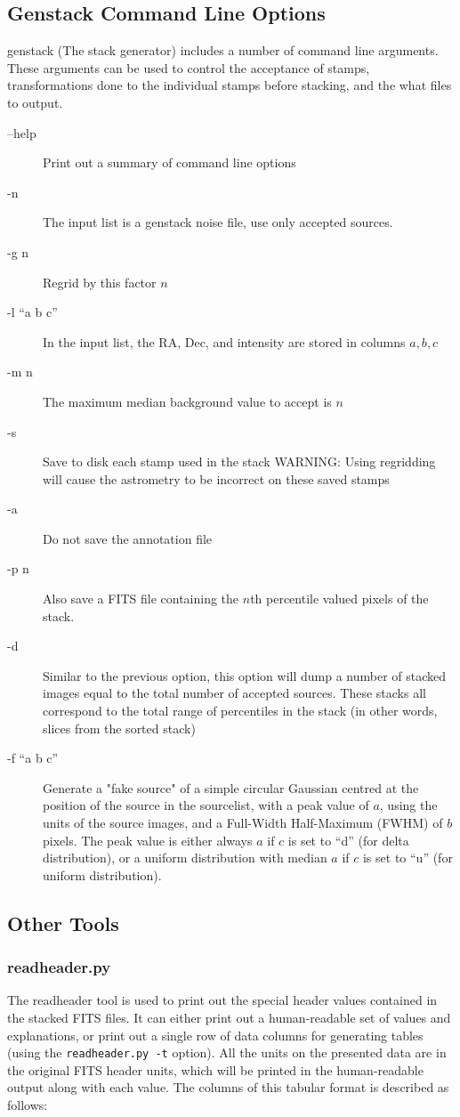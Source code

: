 \documentclass{article}
\begin{document}
\subsection{Genstack Command Line Options}
genstack (The stack generator) includes a number of command line arguments.  
These arguments can be used to control the acceptance of stamps, transformations
done to the individual stamps before stacking, and the what files to output.
\begin{description}
	\item[--help]  Print out a summary of command line options
	\item[-n] The input list is a genstack noise file, use only accepted sources.
	\item[-g n] Regrid by this factor $n$
	\item[-l ``a b c'']  In the input list, the RA, Dec, and intensity are stored in columns $a,b,c$
	\item[-m n] The maximum median background value to accept is $n$
	\item[-s] Save to disk each stamp used in the stack WARNING: Using 
	regridding will cause the astrometry to be incorrect on these saved stamps
	\item[-a] Do not save the annotation file
	\item[-p n] Also save a FITS file containing the $n$th percentile valued 
	pixels of the stack.
	\item[-d] Similar to the previous option, this option will dump a number of
	stacked images equal to the total number of accepted sources.  These stacks
	all correspond to the total range of percentiles in the stack (in other 
	words, slices from the sorted stack)
	\item[-f ``a b c''] Generate a "fake source" of a simple circular Gaussian 
	centred at the position of the source in the sourcelist, with a peak value 
	of $a$, using the units of the source images, and a Full-Width Half-Maximum		(FWHM) of $b$ pixels.  The peak value is either always $a$ if $c$ is set to
	``d'' (for delta distribution), or a uniform distribution with median $a$ if
	$c$ is set to ``u'' (for uniform distribution).
\end{description}

\subsection{Other Tools}
\subsubsection{readheader.py}
The readheader tool is used to print out the special header values contained in 
the stacked FITS files.  It can either print out a human-readable set of values
and explanations, or print out a single row of data columns for generating 
tables (using the \verb!readheader.py -t! option). All the units on the 
presented data are in the original FITS header units, which will be printed
in the human-readable output along with each value. The columns of this tabular
format is described as follows:
\end{document}
